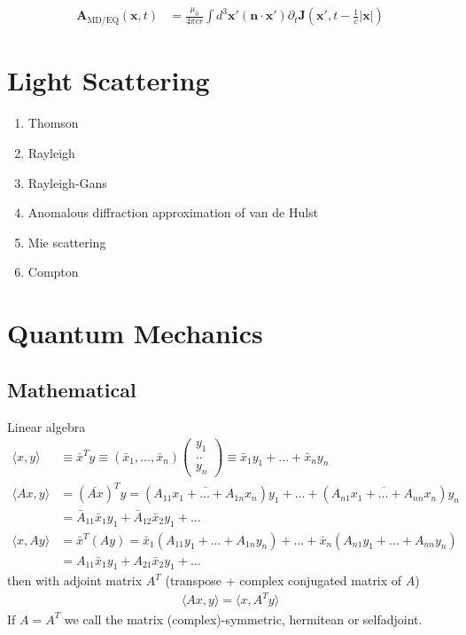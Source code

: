 \documentclass[../main.tex]{subfiles}
\begin{document}
\begin{align}
\mathbf{A}_\text{MD/EQ}(\mathbf{x},t)
&=\frac{\mu_0}{4\pi cr}\int d^3\mathbf{x}'(\mathbf{n}\cdot\mathbf{x}')\partial_t\mathbf{J}(\mathbf{x}',t-\frac{1}{c}|\mathbf{x}|)
\end{align}

\section{Light Scattering}

\begin{enumerate}
\item Thomson
\item Rayleigh 
\item Rayleigh-Gans
\item Anomalous diffraction approximation of van de Hulst
\item Mie scattering
\item Compton
\end{enumerate}

\section{Quantum Mechanics}
\subsection{Mathematical}
Linear algebra
\begin{align}
\langle x,y\rangle
&\equiv \bar{x}^Ty
\equiv(\bar{x}_1,...,\bar{x}_n)
\left(
\begin{array}{c}
y_1\\
..\\
y_n
\end{array}
\right)
\equiv \bar{x}_1y_1+...+\bar{x}_ny_n\\
\langle Ax,y\rangle
&=(\overline{Ax})^Ty
=(\overline{A_{11}x_1+...+A_{1n}x_n})y_1
+...+(\overline{A_{n1}x_1+...+A_{nn}x_n})y_n\\
&=\bar{A}_{11}\bar{x}_1y_1+\bar{A}_{12}\bar{x}_2y_1+...\\
\langle x,Ay\rangle
&=\bar{x}^T(Ay)
=\bar{x}_1(A_{11}y_1+...+A_{1n}y_n)+...+\bar{x}_n(A_{n1}y_1+...+A_{nn}y_n)\\
&=A_{11}\bar{x}_1y_1+A_{21}\bar{x}_2y_1+...
\end{align}
then with adjoint matrix $A^T$ (transpose + complex conjugated matrix of $A$)
\begin{align}
\langle Ax,y\rangle=\langle x,A^Ty\rangle
\end{align}
If $A=A^T$ we call the matrix (complex)-symmetric, hermitean or selfadjoint.
\end{document}
